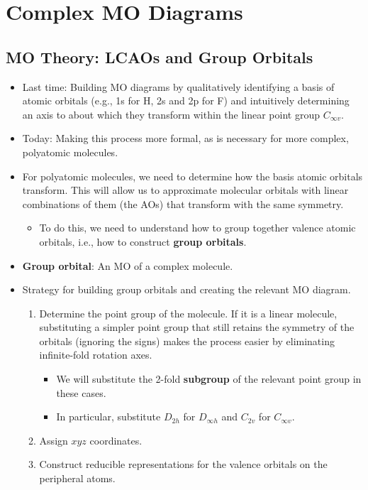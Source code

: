 \documentclass[../notes.tex]{subfiles}
\begin{document}
\chapter{Complex MO Diagrams}
\section{MO Theory: LCAOs and Group Orbitals}
\begin{itemize}
    \item {}Last time: Building MO diagrams by qualitatively identifying a basis of atomic orbitals (e.g., 1s for H, 2s and 2p for F) and intuitively determining an axis to about which they transform within the linear point group $C_{\infty v}$.
    \item Today: Making this process more formal, as is necessary for more complex, polyatomic molecules.
    \item For polyatomic molecules, we need to determine how the basis atomic orbitals transform. This will allow us to approximate molecular orbitals with linear combinations of them (the AOs) that transform with the same symmetry.
    \begin{itemize}
        \item To do this, we need to understand how to group together valence atomic orbitals, i.e., how to construct \textbf{group orbitals}.
    \end{itemize}
    \item \textbf{Group orbital}: An MO of a complex molecule.
    \item Strategy for building group orbitals and creating the relevant MO diagram.
    \begin{enumerate}
        \item Determine the point group of the molecule. If it is a linear molecule, substituting a simpler point group that still retains the symmetry of the orbitals (ignoring the signs) makes the process easier by eliminating infinite-fold rotation axes.
        \begin{itemize}
            \item We will substitute the 2-fold \textbf{subgroup} of the relevant point group in these cases.
            \item In particular, substitute $D_{2h}$ for $D_{\infty h}$ and $C_{2v}$ for $C_{\infty v}$.
        \end{itemize}
        \item Assign $xyz$ coordinates.
        \item Construct reducible representations for the valence orbitals on the peripheral atoms.

\end{enumerate}
\end{itemize}
\end{document}
